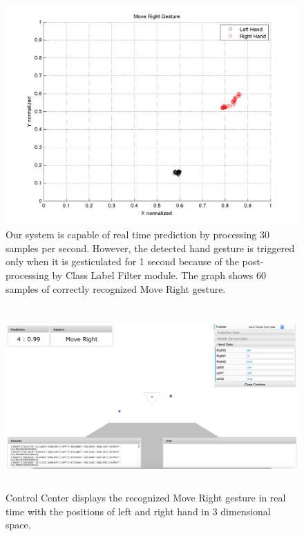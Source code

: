 \begin{figure}
	[h] \hspace{-15 mm} \centering 
	\includegraphics[width=155mm]{figures/result/test-move-right.png} \caption{Our system is capable of real time prediction by processing 30 samples per second. However, the detected hand gesture is triggered only when it is gesticulated for 1 second because of the post-processing by Class Label Filter module. The graph shows 60 samples of correctly recognized Move Right gesture. } \label{res:pl:move:right} 
\end{figure}
\begin{figure}
	[h] \centering 
	\includegraphics[height=70mm]{figures/result/cc-move-right.jpg} \caption{Control Center displays the recognized Move Right gesture in real time with the positions of left and right hand in 3 dimensional space.} \label{res:cc:move:right} 
\end{figure}
